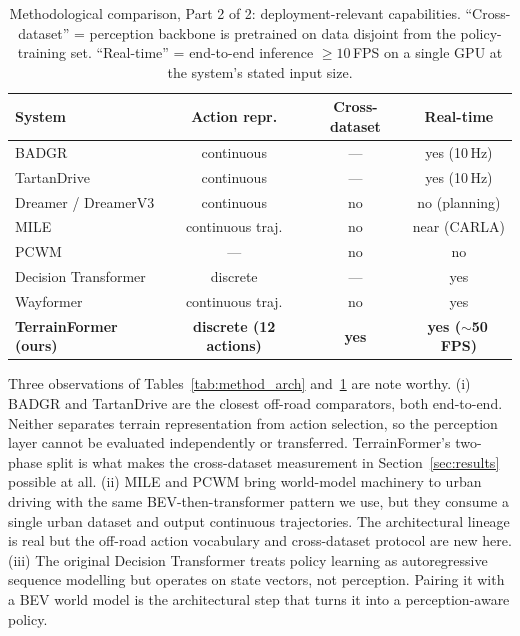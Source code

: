 \documentclass[sensors,article,submit,pdftex,moreauthors]{Definitions/mdpi}
\begin{document}
\begin{table}[h]
\caption{Methodological comparison, Part 2 of 2: deployment-relevant capabilities. ``Cross-dataset'' = perception backbone is pretrained on data disjoint from the policy-training set. ``Real-time'' = end-to-end inference $\geq 10$\,FPS on a single GPU at the system's stated input size.}
\label{tab:method_caps}
\centering
\footnotesize
\begin{tabular}{lccc}
\toprule
System & Action repr. & Cross-dataset & Real-time \\
\midrule
BADGR \cite{kahn2021}              & continuous       & ---  & yes (10\,Hz) \\
TartanDrive \cite{triest2023}      & continuous       & ---  & yes (10\,Hz) \\
Dreamer / DreamerV3 \cite{hafner2020,hafner2023} & continuous & no   & no (planning) \\
MILE \cite{hu2022}                 & continuous traj. & no   & near (CARLA) \\
PCWM \cite{yang2023}               & ---              & no   & no \\
Decision Transformer \cite{chen2021}& discrete        & ---  & yes \\
Wayformer \cite{nayakanti2023}     & continuous traj. & no   & yes \\
\textbf{TerrainFormer (ours)}      & \textbf{discrete (12 actions)} & \textbf{yes} & \textbf{yes ($\sim$50\,FPS)} \\
\bottomrule
\end{tabular}
\end{table}

Three observations of Tables~\ref{tab:method_arch} and~\ref{tab:method_caps} are note worthy. (i) BADGR \cite{kahn2021} and TartanDrive \cite{triest2023} are the closest off-road comparators, both end-to-end. Neither separates terrain representation from action selection, so the perception layer cannot be evaluated independently or transferred. TerrainFormer's two-phase split is what makes the cross-dataset measurement in Section~\ref{sec:results} possible at all. (ii) MILE \cite{hu2022} and PCWM \cite{yang2023} bring world-model machinery to urban driving with the same BEV-then-transformer pattern we use, but they consume a single urban dataset and output continuous trajectories. The architectural lineage is real but the off-road action vocabulary and cross-dataset protocol are new here. (iii) The original Decision Transformer \cite{chen2021} treats policy learning as autoregressive sequence modelling but operates on state vectors, not perception. Pairing it with a BEV world model is the architectural step that turns it into a perception-aware policy.
\end{document}
